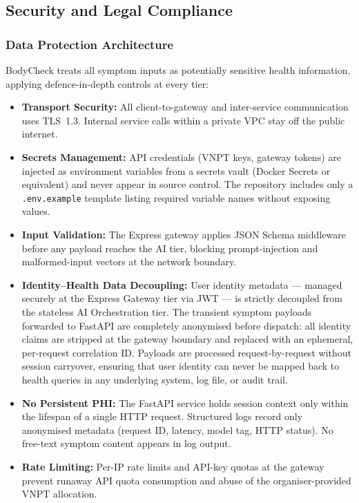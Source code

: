 \subsection{Security and Legal Compliance}
\label{sec:feasibility-security}

\subsubsection*{Data Protection Architecture}

BodyCheck treats all symptom inputs as potentially sensitive health information,
applying defence-in-depth controls at every tier:

\begin{itemize}[leftmargin=2em, itemsep=3pt, topsep=4pt]
  \item \textbf{Transport Security:}
        All client-to-gateway and inter-service communication uses TLS~1.3.
        Internal service calls within a private VPC stay off the public internet.
  \item \textbf{Secrets Management:}
        API credentials (VNPT keys, gateway tokens) are injected as
        environment variables from a secrets vault (Docker Secrets or
        equivalent) and never appear in source control. The repository
        includes only a \texttt{.env.example} template listing required
        variable names without exposing values.
  \item \textbf{Input Validation:}
        The Express gateway applies JSON Schema middleware before any payload
        reaches the AI tier, blocking prompt-injection and malformed-input
        vectors at the network boundary.
  \item \textbf{Identity--Health Data Decoupling:}
        User identity metadata --- managed securely at the Express Gateway
        tier via JWT --- is strictly decoupled from the stateless AI
        Orchestration tier. The transient symptom payloads forwarded to
        FastAPI are completely anonymised before dispatch: all identity
        claims are stripped at the gateway boundary and replaced with an
        ephemeral, per-request correlation ID. Payloads are processed
        request-by-request without session carryover, ensuring that user
        identity can never be mapped back to health queries in any
        underlying system, log file, or audit trail.
  \item \textbf{No Persistent PHI:}
        The FastAPI service holds session context only within the lifespan of
        a single HTTP request. Structured logs record only anonymised metadata
        (request ID, latency, model tag, HTTP status). No free-text symptom
        content appears in log output.
  \item \textbf{Rate Limiting:}
        Per-IP rate limits and API-key quotas at the gateway prevent
        runaway API quota consumption and abuse of the organiser-provided
        VNPT allocation.
\end{itemize}

